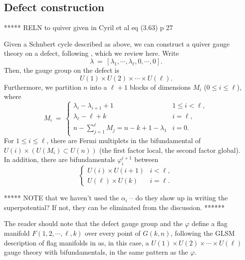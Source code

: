\documentclass[12pt]{article}
\begin{document}
\subsection{Defect construction}

***** RELN to quiver given in Cyril et al eq (3.63) p 27

Given a Schubert cycle described as above, we can construct a quiver
gauge theory on a defect, following \cite[section 3.3.3]{Closset:2023bdr},
which we review here.
Write
\begin{equation}
\lambda \: = \: [ \lambda_1, \cdots, \lambda_{\ell}, 0, \cdots, 0 ].
\end{equation}
Then, the gauge group on the defect is
\begin{equation}
U(1) \times U(2) \times \cdots \times U(\ell).
\end{equation}
Furthermore, we partition $n$ into a $\ell+1$ blocks of dimensions
$M_i$ ($0 \leq i \leq \ell$), where
\begin{equation}
M_i \: = \: \left\{ \begin{array}{cl}
\lambda_i - \lambda_{i+1} + 1 & 1 \leq i < \ell, \\
\lambda_{\ell} - \ell + k & i = \ell, \\
n - \sum_{j=1}^{\ell} M_j = n-k+1-\lambda_1  & i = 0 .
\end{array} \right.
\end{equation}
For $1 \leq i \leq \ell$, there are Fermi multiplets in the
bifundamental of $U(i) \times \left( U(M_i) \subset U(n) \right)$
(the first factor local, the second factor global). 
In addition, there are bifundamentals $\varphi_i^{i+1}$ between
\begin{equation}
\left\{ \begin{array}{cl}
U(i) \times U(i+1) & i < \ell, \\
U(\ell) \times U(k) & i = \ell.
\end{array} \right.
\end{equation}


***** NOTE that we haven't used the $\alpha_i$ -- do they show up in
writing the superpotential?  If not, they can be eliminated from the discussion.
******

The reader should note that the defect gauge group and the $\varphi$
define a flag manifold $F(1,2,\cdots,\ell, k)$ over every point
of $G(k,n)$, following the GLSM description of flag manifolds 
in \cite{Donagi:2007hi} as, in this case, a $U(1) \times U(2)
\times \cdots \times U(\ell)$ gauge theory with bifundamentals,
in the same pattern as the $\varphi$.
\end{document}
